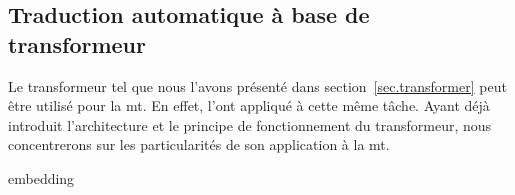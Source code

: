 \subsection{Traduction automatique à base de transformeur}
\label{subsec.nmt-transformer}

Le transformeur tel que nous l'avons présenté dans section~\ref{sec.transformer}
peut être utilisé pour la \gls{mt}.
En effet, \cite{attention} l'ont appliqué à cette même tâche.
Ayant déjà introduit l'architecture et le principe de fonctionnement du transformeur,
nous concentrerons sur les particularités de son application à la \gls{mt}.

{embedding}
